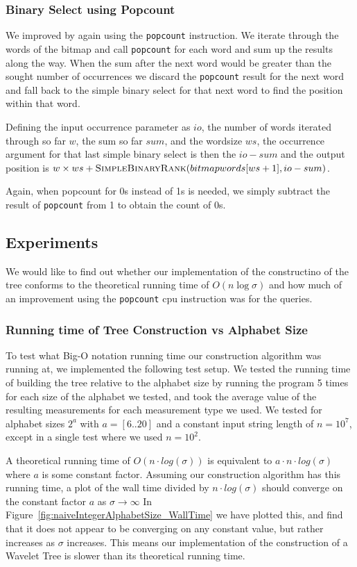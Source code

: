 \subsubsection{Binary Select using Popcount}
\label{sec:ImplBinarySelect}
We improved  by again using the \texttt{popcount} instruction. 
We iterate through the words of the bitmap and call \texttt{popcount} for each word and sum up the results along the way. 
When the sum after the next word would be greater than the sought number of occurrences we discard the \texttt{popcount} result for the next word and fall back to the simple binary select for that next word to find the position within that word.

Defining the input occurrence parameter as $io$, the number of words iterated through so far $w$, the sum so far $sum$, and the wordsize $ws$, the occurrence argument for that last simple binary select is then the $io - sum$ and the output position is $w \times ws + \textproc{SimpleBinaryRank}(bitmapwords[ws+1], io - sum)$.

Again, when popcount for 0s instead of 1s is needed, we simply subtract the result of \texttt{popcount} from 1 to obtain the count of 0s.

\subsection{Experiments}
We would like to find out whether our implementation of the constructino of the tree conforms to the theoretical running time of $O(n \log \sigma)$ and how much of an improvement using the \texttt{popcount} cpu instruction was for the queries.


\subsubsection{Running time of Tree Construction vs Alphabet Size}
To test what Big-O notation running time our construction algorithm was running at, we implemented the following test setup.
We tested the running time of building the tree relative to the alphabet size by running the program 5 times for each size of the alphabet we tested, and took the average value of the resulting measurements for each measurement type we used.
We tested for alphabet sizes $2^a$ with $a = [6..20]$ and a constant input string length of $n = 10^7$, except in a single test where we used $n = 10^2$.

A theoretical running time of $O(n \cdot log(\sigma))$ is equivalent to $a \cdot n \cdot log(\sigma)$ where $a$ is some constant factor.
Assuming our construction algorithm has this running time, a plot of the wall time divided by $n \cdot log(\sigma)$ should converge on the constant factor $a$ as $\sigma \rightarrow \infty$
In Figure~\ref{fig:naiveIntegerAlphabetSize_WallTime} we have plotted this, and find that it does not appear to be converging on any constant value, but rather increases as $\sigma$ increases.
This means our implementation of the construction of a Wavelet Tree is slower than its theoretical running time.

